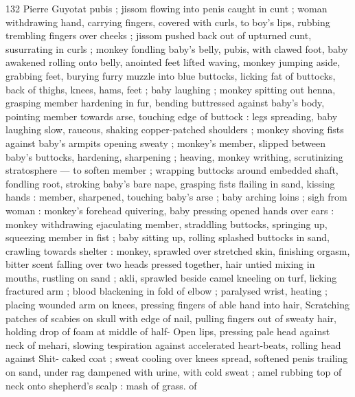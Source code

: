 132 Pierre Guyotat
pubis ; jissom flowing into penis caught in cunt ; woman withdrawing
hand, carrying fingers, covered with curls, to boy's lips, rubbing
trembling fingers over cheeks ; jissom pushed back out of upturned
cunt, susurrating in curls ; monkey fondling baby's belly, pubis, with
clawed foot, baby awakened rolling onto belly, anointed feet lifted
waving, monkey jumping aside, grabbing feet, burying furry muzzle
into blue buttocks, licking fat of buttocks, back of thighs, knees,
hams, feet ; baby laughing ; monkey spitting out henna, grasping
member hardening in fur, bending buttressed against baby's body,
pointing member towards arse, touching edge of buttock : legs
spreading, baby laughing slow, raucous, shaking copper-patched
shoulders ; monkey shoving fists against baby’s armpits opening
sweaty ; monkey's member, slipped between baby's buttocks,
hardening, sharpening ; heaving, monkey writhing, scrutinizing
stratosphere — to soften member ; wrapping buttocks around
embedded shaft, fondling root, stroking baby's bare nape, grasping
fists flailing in sand, kissing hands : member, sharpened, touching
baby's arse ; baby arching loins ; sigh from woman : monkey's
forehead quivering, baby pressing opened hands over ears : monkey
withdrawing ejaculating member, straddling buttocks, springing up,
squeezing member in fist ; baby sitting up, rolling splashed buttocks
in sand, crawling towards shelter : monkey, sprawled over stretched
skin, finishing orgasm, bitter scent falling over two heads pressed
together, hair untied mixing in mouths, rustling on sand ; akli,
sprawled beside camel kneeling on turf, licking fractured arm ; blood
blackening in fold of elbow ; paralysed wrist, heating ; placing
wounded arm on knees, pressing fingers of able hand into hair,
Scratching patches of scabies on skull with edge of nail, pulling
fingers out of sweaty hair, holding drop of foam at middle of half-
Open lips, pressing pale head against neck of mehari, slowing
tespiration against accelerated heart-beats, rolling head against
Shit- caked coat ; sweat cooling over knees spread, softened penis
trailing on sand, under rag dampened with urine, with cold sweat ;
amel rubbing top of neck onto shepherd's scalp : mash of grass. of

